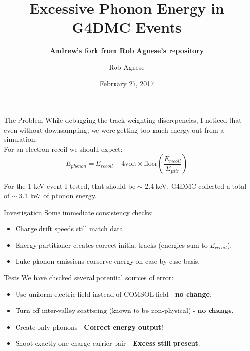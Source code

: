 \documentclass{beamer}
\title[G4DMC]{Excessive Phonon Energy in G4DMC Events}
\subtitle{\textbf{ \href{https://github.com/andrewrgarcia/beamer-theme-UF}{Andrew's fork} from \href{https://github.com/ragnese/beamer-theme-UF}{Rob Agnese's repository} }}
\author{Rob Agnese}
\institute{University of Florida}
\date{February 27, 2017}
\begin{document}
\begin{frame}
    \titlepage{}
\end{frame}

\begin{frame}{The Problem}
    \vfill
    While debugging the track weighting discrepencies, I noticed that
    even without downsampling, we were getting too much energy out from a 
    simulation. \\

    For an electron recoil we should expect:
    \begin{equation}
        E_{phonon} = E_{recoil} + 4 \textrm{volt} \times 
        \textrm{floor}\left(\frac{E_{recoil}}{E_{pair}}\right)
    \end{equation}

    For the 1 keV event I tested, that should be $\sim$ 2.4 keV. G4DMC collected
    a total of $\sim$ 3.1 keV of phonon energy.
    \vfill
\end{frame}

\begin{frame}{Investigation}
    \vfill
    Some immediate consistency checks:
    \begin{itemize}
        \item Charge drift speeds still match data.
        \item Energy partitioner creates correct initial tracks (energies sum to $E_{recoil}$).
        \item Luke phonon emissions conserve energy on case-by-case basis.
    \end{itemize}
    \vfill
\end{frame}

\begin{frame}{Tests}
    \vfill
    We have checked several potential sources of error:
    \begin{itemize}
        \item Use uniform electric field instead of COMSOL field - \textbf{no change}.
        \item Turn off inter-valley scattering (known to be non-physical) - \textbf{no change}.
        \item Create only phonons - \textbf{Correct energy output}!
        \item Shoot exactly one charge carrier pair - \textbf{Excess still present}.
    \end{itemize}
    \vfill
\end{frame}
\end{document}
